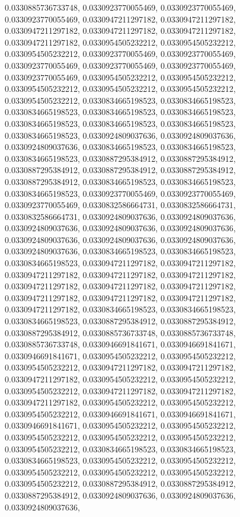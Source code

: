 \documentclass[
  ,man]{apa6}
\begin{document}
0.0330885736733748, 0.0330923770055469, 0.0330923770055469, 0.0330923770055469, 0.0330947211297182, 0.0330947211297182, 0.0330947211297182, 0.0330947211297182, 0.0330947211297182, 0.0330947211297182, 0.0330954505232212, 0.0330954505232212, 0.0330954505232212, 0.0330923770055469, 0.0330923770055469, 0.0330923770055469, 0.0330923770055469, 0.0330923770055469, 0.0330923770055469, 0.0330954505232212, 0.0330954505232212, 0.0330954505232212, 0.0330954505232212, 0.0330954505232212, 0.0330954505232212, 0.0330834665198523,
0.0330834665198523, 0.0330834665198523, 0.0330834665198523, 0.0330834665198523, 0.0330834665198523, 0.0330834665198523, 0.0330834665198523, 0.0330834665198523, 0.0330924809037636, 0.0330924809037636, 0.0330924809037636, 0.0330834665198523, 0.0330834665198523, 0.0330834665198523, 0.0330887295384912, 0.0330887295384912, 0.0330887295384912, 0.0330887295384912, 0.0330887295384912, 0.0330887295384912, 0.0330834665198523, 0.0330834665198523, 0.0330834665198523, 0.0330923770055469, 0.0330923770055469, 0.0330923770055469,
0.0330832586664731, 0.0330832586664731, 0.0330832586664731, 0.0330924809037636, 0.0330924809037636, 0.0330924809037636, 0.0330924809037636, 0.0330924809037636, 0.0330924809037636, 0.0330924809037636, 0.0330924809037636, 0.0330924809037636, 0.0330834665198523, 0.0330834665198523, 0.0330834665198523, 0.0330947211297182, 0.0330947211297182, 0.0330947211297182, 0.0330947211297182, 0.0330947211297182, 0.0330947211297182, 0.0330947211297182, 0.0330947211297182, 0.0330947211297182, 0.0330947211297182, 0.0330947211297182,
0.0330947211297182, 0.0330834665198523, 0.0330834665198523, 0.0330834665198523, 0.0330887295384912, 0.0330887295384912, 0.0330887295384912, 0.0330885736733748, 0.0330885736733748, 0.0330885736733748, 0.0330946691841671, 0.0330946691841671, 0.0330946691841671, 0.0330954505232212, 0.0330954505232212, 0.0330954505232212, 0.0330947211297182, 0.0330947211297182, 0.0330947211297182, 0.0330954505232212, 0.0330954505232212, 0.0330954505232212, 0.0330947211297182, 0.0330947211297182, 0.0330947211297182, 0.0330954505232212,
0.0330954505232212, 0.0330954505232212, 0.0330946691841671, 0.0330946691841671, 0.0330946691841671, 0.0330954505232212, 0.0330954505232212, 0.0330954505232212, 0.0330954505232212, 0.0330954505232212, 0.0330954505232212, 0.0330834665198523, 0.0330834665198523, 0.0330834665198523, 0.0330954505232212, 0.0330954505232212, 0.0330954505232212, 0.0330954505232212, 0.0330954505232212, 0.0330954505232212, 0.0330887295384912, 0.0330887295384912, 0.0330887295384912, 0.0330924809037636, 0.0330924809037636, 0.0330924809037636,
\end{document}
